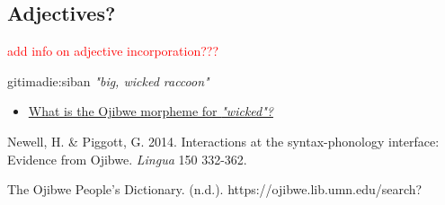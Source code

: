 \documentclass[a4paper,11pt]{article}
\begin{document}
\pagebreak
\subsection{Adjectives?}

\textcolor{red}{add info on adjective incorporation???}

\vspace{1cm}
\begin{exe}
\ex gitimad{\textyogh}ie:siban \hspace{2cm} \textit{"big, wicked raccoon"}
\end{exe}
\vspace{1cm}

\begin{itemize}
\item \underline{What is the Ojibwe morpheme for \textit{"wicked"?}}
\end{itemize}
\vspace{1cm}

\begin{thebibliography}{20}
\addtolength{\leftmargin}{0.2in} %
\setlength{\itemindent}{-0.2in}

 Newell, H. \& Piggott, G. 2014. Interactions at the syntax-phonology interface: Evidence from Ojibwe. \textit{Lingua} 150 332-362.

 The Ojibwe People’s Dictionary. (n.d.). https://ojibwe.lib.umn.edu/search?


\end{thebibliography}
\end{document}
